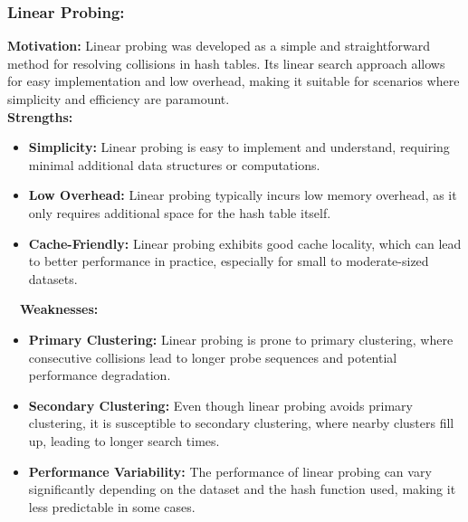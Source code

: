 \documentclass[12pt]{article}
\begin{document}
\subsubsection{Linear Probing:}
\textbf{Motivation:} Linear probing was developed as a simple and straightforward method for resolving collisions in hash tables. Its linear search approach allows for easy implementation and low overhead, making it suitable for scenarios where simplicity and efficiency are paramount.
\\
\textbf{Strengths:}
\begin{itemize}
    \item \textbf{Simplicity:} Linear probing is easy to implement and understand, requiring minimal additional data structures or computations.
    \item \textbf{Low Overhead:} Linear probing typically incurs low memory overhead, as it only requires additional space for the hash table itself.
    \item \textbf{Cache-Friendly:} Linear probing exhibits good cache locality, which can lead to better performance in practice, especially for small to moderate-sized datasets.
    \\
\end{itemize}
\ \
\textbf{Weaknesses:}
\begin{itemize}
    \item \textbf{Primary Clustering:} Linear probing is prone to primary clustering, where consecutive collisions lead to longer probe sequences and potential performance degradation.
    \item \textbf{Secondary Clustering:} Even though linear probing avoids primary clustering, it is susceptible to secondary clustering, where nearby clusters fill up, leading to longer search times.
    \item \textbf{Performance Variability:} The performance of linear probing can vary significantly depending on the dataset and the hash function used, making it less predictable in some cases.
\end{itemize}
\end{document}

